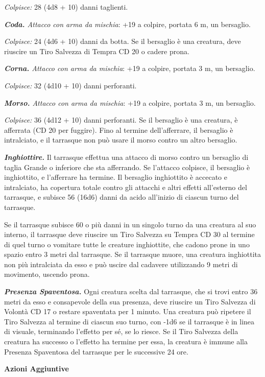 \begin{multicols}{2}
\emph{Colpisce:} 28 (4d8 + 10) danni taglienti.

\emph{\textbf{Coda.} Attacco con arma da mischia}: +19 a colpire,
portata 6 m, un bersaglio.

\emph{Colpisce:} 24 (4d6 + 10) danni da botta. Se il bersaglio è una creatura, deve riuscire un Tiro Salvezza di Tempra CD 20 o cadere prona.

\emph{\textbf{Corna.} Attacco con arma da mischia}: +19 a colpire, portata 3 m, un bersaglio.

\emph{Colpisce:} 32 (4d10 + 10) danni perforanti.

\emph{\textbf{Morso.} Attacco con arma da mischia}: +19 a colpire, portata 3 m, un bersaglio.

\emph{Colpisce:} 36 (4d12 + 10) danni perforanti. Se il bersaglio è una creatura, è afferrata (CD 20 per fuggire). Fino al termine dell'afferrare, il bersaglio è intralciato, e il tarrasque non può usare il morso contro un altro bersaglio.

\emph{\textbf{Inghiottire.}} Il tarrasque effettua una attacco di morso contro un bersaglio di taglia Grande o inferiore che sta afferrando. Se l'attacco colpisce, il bersaglio è inghiottito, e l'afferrare ha termine. Il bersaglio inghiottito è accecato e intralciato, ha copertura totale contro gli attacchi e altri effetti all'esterno del tarrasque, e subisce 56 (16d6) danni da acido all'inizio di ciascun turno del tarrasque.

Se il tarrasque subisce 60 o più danni in un singolo turno da una creatura al suo interno, il tarrasque deve riuscire un Tiro Salvezza su Tempra CD 30 al termine di quel turno o vomitare tutte le creature inghiottite, che cadono prone in uno spazio entro 3 metri dal tarrasque. Se il tarrasque muore, una creatura inghiottita non  più intralciata da esso e può uscire dal cadavere utilizzando 9 metri  di movimento, uscendo prona. 

\emph{\textbf{Presenza Spaventosa.}} Ogni creatura scelta dal tarrasque, che si trovi entro 36 metri da esso e consapevole della sua presenza, deve riuscire un Tiro Salvezza di Volontà CD 17 o restare spaventata per 1 minuto. Una creatura può ripetere il Tiro Salvezza al termine di ciascun suo turno, con -1d6 se il tarrasque è in linea di visuale, terminando l'effetto per sé, se lo riesce. Se il Tiro Salvezza della creatura ha successo o l'effetto ha termine per essa, la creatura è immune alla Presenza Spaventosa del tarrasque per le successive 24 ore.

\textbf{Azioni Aggiuntive}


\end{multicols}
